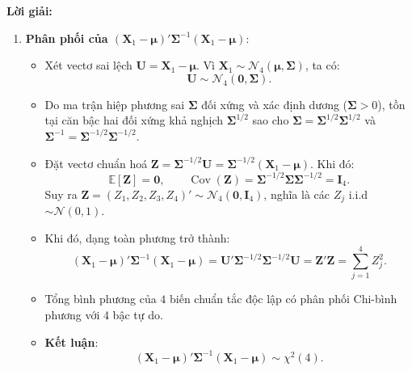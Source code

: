 \documentclass[11pt,a4paper]{article}
\newenvironment{solution}{%
  \par\noindent\textbf{Lời giải:}\ \ignorespaces
}{\par}
\theoremstyle{definition}
\newcommand{\answer}[1]{\boxed{#1}}
\begin{document}
\begin{solution}
\begin{enumerate}[label=\textbf{\alph*)}]
  \item \textbf{Phân phối của $(\mathbf{X}_1 - \boldsymbol{\mu})' \boldsymbol{\Sigma}^{-1} (\mathbf{X}_1 - \boldsymbol{\mu})$}:
  \begin{itemize}
    \item Xét vectơ sai lệch $\mathbf{U} = \mathbf{X}_1 - \boldsymbol{\mu}$. Vì $\mathbf{X}_1 \sim \mathcal{N}_4(\boldsymbol{\mu}, \boldsymbol{\Sigma})$, ta có:
    \[
    \mathbf{U} \sim \mathcal{N}_4(\mathbf{0}, \boldsymbol{\Sigma}).
    \]
    \item Do ma trận hiệp phương sai $\boldsymbol{\Sigma}$ đối xứng và xác định dương ($\boldsymbol{\Sigma} > 0$), tồn tại căn bậc hai đối xứng khả nghịch $\boldsymbol{\Sigma}^{1/2}$ sao cho $\boldsymbol{\Sigma} = \boldsymbol{\Sigma}^{1/2}\boldsymbol{\Sigma}^{1/2}$ và $\boldsymbol{\Sigma}^{-1} = \boldsymbol{\Sigma}^{-1/2}\boldsymbol{\Sigma}^{-1/2}$.
    \item Đặt vectơ chuẩn hoá $\mathbf{Z} = \boldsymbol{\Sigma}^{-1/2}\mathbf{U} = \boldsymbol{\Sigma}^{-1/2}(\mathbf{X}_1 - \boldsymbol{\mu})$. Khi đó:
    \[
    \mathbb{E}[\mathbf{Z}] = \mathbf{0}, \qquad \operatorname{Cov}(\mathbf{Z}) = \boldsymbol{\Sigma}^{-1/2}\boldsymbol{\Sigma}\boldsymbol{\Sigma}^{-1/2} = \mathbf{I}_4.
    \]
    Suy ra $\mathbf{Z} = (Z_1, Z_2, Z_3, Z_4)' \sim \mathcal{N}_4(\mathbf{0}, \mathbf{I}_4)$, nghĩa là các $Z_j$ i.i.d $\sim \mathcal{N}(0, 1)$.
    \item Khi đó, dạng toàn phương trở thành:
    \[
    (\mathbf{X}_1 - \boldsymbol{\mu})' \boldsymbol{\Sigma}^{-1} (\mathbf{X}_1 - \boldsymbol{\mu}) = \mathbf{U}' \boldsymbol{\Sigma}^{-1/2} \boldsymbol{\Sigma}^{-1/2} \mathbf{U} = \mathbf{Z}'\mathbf{Z} = \sum_{j=1}^4 Z_j^2.
    \]
    \item Tổng bình phương của $4$ biến chuẩn tắc độc lập có phân phối Chi-bình phương với 4 bậc tự do.
    \item \textbf{Kết luận}:
    \[
    (\mathbf{X}_1 - \boldsymbol{\mu})' \boldsymbol{\Sigma}^{-1} (\mathbf{X}_1 - \boldsymbol{\mu}) \sim \answer{\chi^2(4)}.
    \]
  \end{itemize}


\end{enumerate}
\end{solution}
\end{document}
